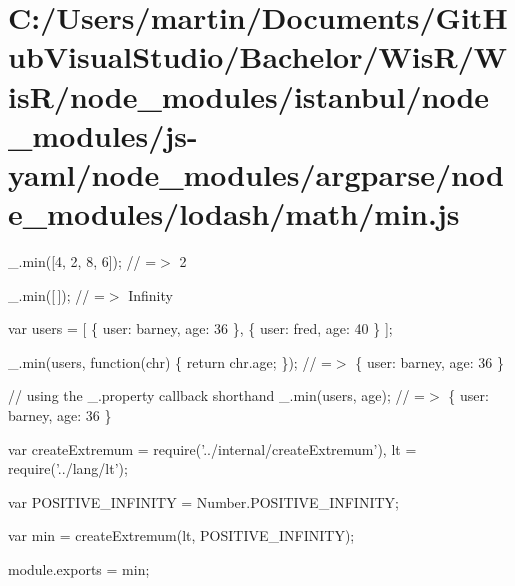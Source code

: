 \hypertarget{_c_1_2_users_2martin_2_documents_2_git_hub_visual_studio_2_bachelor_2_wis_r_2_wis_r_2node_modulefffc88e5638ffa4805a7370f54cd9125}{}\section{C\+:/\+Users/martin/\+Documents/\+Git\+Hub\+Visual\+Studio/\+Bachelor/\+Wis\+R/\+Wis\+R/node\+\_\+modules/istanbul/node\+\_\+modules/js-\/yaml/node\+\_\+modules/argparse/node\+\_\+modules/lodash/math/min.\+js}
\+\_\+.\+min(\mbox{[}4, 2, 8, 6\mbox{]}); // =$>$ 2

\+\_\+.\+min(\mbox{[}$\,$\mbox{]}); // =$>$ Infinity

var users = \mbox{[} \{ \textquotesingle{}user\textquotesingle{}\+: \textquotesingle{}barney\textquotesingle{}, \textquotesingle{}age\textquotesingle{}\+: 36 \}, \{ \textquotesingle{}user\textquotesingle{}\+: \textquotesingle{}fred\textquotesingle{}, \textquotesingle{}age\textquotesingle{}\+: 40 \} \mbox{]};

\+\_\+.\+min(users, function(chr) \{ return chr.\+age; \}); // =$>$ \{ \textquotesingle{}user\textquotesingle{}\+: \textquotesingle{}barney\textquotesingle{}, \textquotesingle{}age\textquotesingle{}\+: 36 \}

// using the {\ttfamily \+\_\+.\+property} callback shorthand \+\_\+.\+min(users, \textquotesingle{}age\textquotesingle{}); // =$>$ \{ \textquotesingle{}user\textquotesingle{}\+: \textquotesingle{}barney\textquotesingle{}, \textquotesingle{}age\textquotesingle{}\+: 36 \}


\begin{DoxyCodeInclude}
var createExtremum = require(\textcolor{stringliteral}{'../internal/createExtremum'}),
    lt = require(\textcolor{stringliteral}{'../lang/lt'});

var POSITIVE\_INFINITY = Number.POSITIVE\_INFINITY;

var min = createExtremum(lt, POSITIVE\_INFINITY);

module.exports = min;
\end{DoxyCodeInclude}
 